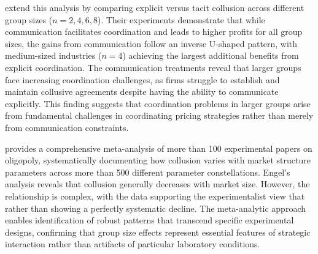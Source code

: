 \textcite{fonseca_explicit_2012} extend this analysis by comparing explicit versus tacit collusion across different group sizes ($n=2,4,6,8$). Their experiments demonstrate that while communication facilitates coordination and leads to higher profits for all group sizes, the gains from communication follow an inverse U-shaped pattern, with medium-sized industries ($n=4$) achieving the largest additional benefits from explicit coordination. The communication treatments reveal that larger groups face increasing coordination challenges, as firms struggle to establish and maintain collusive agreements despite having the ability to communicate explicitly. This finding suggests that coordination problems in larger groups arise from fundamental challenges in coordinating pricing strategies rather than merely from communication constraints.

\textcite{engel_how_2007} provides a comprehensive meta-analysis of more than 100 experimental papers on oligopoly, systematically documenting how collusion varies with market structure parameters across more than 500 different parameter constellations. Engel's analysis reveals that collusion generally decreases with market size. However, the relationship is complex, with the data supporting the experimentalist view that  rather than showing a perfectly systematic decline. The meta-analytic approach enables identification of robust patterns that transcend specific experimental designs, confirming that group size effects represent essential features of strategic interaction rather than artifacts of particular laboratory conditions.

%

